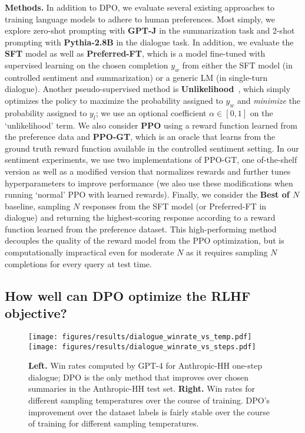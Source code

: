 \documentclass{article}
\begin{document}
\textbf{Methods.} In addition to DPO, we evaluate several existing approaches to training language models to adhere to human preferences. Most simply, we explore zero-shot prompting with \textbf{GPT-J} \citep{gpt-j} in the summarization task and 2-shot prompting with \textbf{Pythia-2.8B} \citep{biderman2023pythia} in the dialogue task. In addition, we evaluate the \textbf{SFT} model as well as \textbf{Preferred-FT}, which is a model fine-tuned with supervised learning on the chosen completion $y_w$ from either the SFT model (in controlled sentiment and summarization) or a generic LM (in single-turn dialogue). Another pseudo-supervised method is \textbf{Unlikelihood}~\citep{welleck2019neural}, which simply optimizes the policy to maximize the probability assigned to $y_w$ and \textit{minimize} the probability assigned to $y_l$; we use an optional coefficient $\alpha\in[0,1]$ on the `unlikelihood' term. We also consider \textbf{PPO} \citep{schulman2017proximal} using a reward function learned from the preference data and \textbf{PPO-GT}, which is an oracle that learns from the ground truth reward function available in the controlled sentiment setting. In our sentiment experiments, we use two implementations of PPO-GT, one of-the-shelf version \cite{leandro_von_werra_2023_7790115} as well as a modified version that normalizes rewards and further tunes hyperparameters to improve performance (we also use these modifications when running `normal' PPO with learned rewards). Finally, we consider the \textbf{Best of $N$} baseline, sampling $N$ responses from the SFT model (or Preferred-FT in dialogue) and returning the highest-scoring response according to a reward function learned from the preference dataset. This high-performing method decouples the quality of the reward model from the PPO optimization, but is computationally impractical even for moderate $N$ as it requires sampling $N$ completions for every query at test time.

\subsection{How well can DPO optimize the RLHF objective?}

\begin{figure}
    \centering
    \texttt{[image: figures/results/dialogue\_winrate\_vs\_temp.pdf]}
    \texttt{[image: figures/results/dialogue\_winrate\_vs\_steps.pdf]}
    \caption{\textbf{Left.} Win rates computed by GPT-4 for Anthropic-HH one-step dialogue; DPO is the only method that improves over chosen summaries in the Anthropic-HH test set. \textbf{Right.} Win rates for different sampling temperatures over the course of training. DPO's improvement over the dataset labels is fairly stable over the course of training for different sampling temperatures.}
    \vspace{-2mm}
    \label{fig:dialogue-main}
\end{figure}
\end{document}
